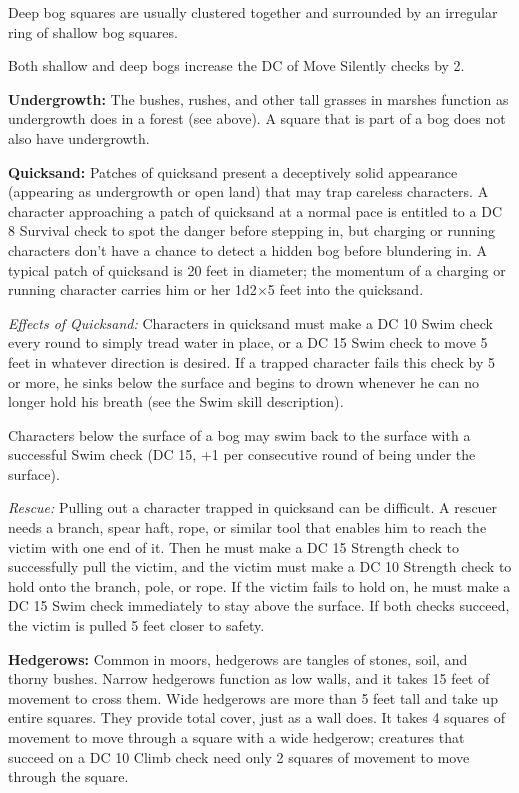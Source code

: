 \documentclass{article}
\begin{document}
Deep bog squares are usually clustered together and surrounded by an irregular 
ring of shallow bog squares.

Both shallow and deep bogs increase the DC of Move Silently checks by 2.

\textbf{Undergrowth:} The bushes, rushes, and other tall grasses in marshes function 
as undergrowth does in a forest (see above). A square that is part of a bog does 
not also have undergrowth. 

\textbf{Quicksand:} Patches of quicksand present a deceptively solid appearance 
(appearing as undergrowth or open land) that may trap careless characters. A character 
approaching a patch of quicksand at a normal pace is entitled to a DC 8 Survival 
check to spot the danger before stepping in, but charging or running characters 
don't have a chance to detect a hidden bog before blundering in. A typical patch 
of quicksand is 20 feet in diameter; the momentum of a charging or running character 
carries him or her 1d2\ensuremath{\times}5 feet into the quicksand.

\textit{Effects of Quicksand: }Characters in quicksand must make a DC 10 Swim check 
every round to simply tread water in place, or a DC 15 Swim check to move 5 feet 
in whatever direction is desired. If a trapped character fails this check by 5 
or more, he sinks below the surface and begins to drown whenever he can no longer 
hold his breath (see the Swim skill description)\textit{.}

Characters below the surface of a bog may swim back to the surface with a successful 
Swim check (DC 15, +1 per consecutive round of being under the surface).

\textit{Rescue: }Pulling out a character trapped in quicksand can be difficult. 
A rescuer needs a branch, spear haft, rope, or similar tool that enables him to 
reach the victim with one end of it. Then he must make a DC 15 Strength check to 
successfully pull the victim, and the victim must make a DC 10 Strength check to 
hold onto the branch, pole, or rope. If the victim fails to hold on, he must make 
a DC 15 Swim check immediately to stay above the surface. If both checks succeed, 
the victim is pulled 5 feet closer to safety.

\textbf{Hedgerows:} Common in moors, hedgerows are tangles of stones, soil, and 
thorny bushes. Narrow hedgerows function as low walls, and it takes 15 feet of 
movement to cross them. Wide hedgerows are more than 5 feet tall and take up entire 
squares. They provide total cover, just as a wall does. It takes 4 squares of movement 
to move through a square with a wide hedgerow; creatures that succeed on a DC 10 
Climb check need only 2 squares of movement to move through the square.
\end{document}
